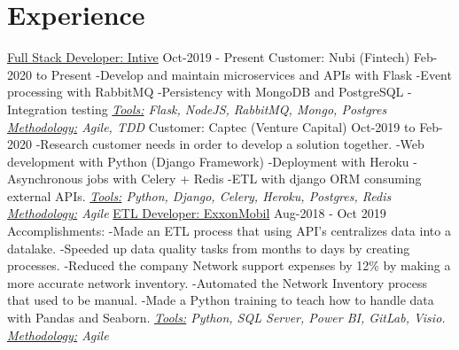 \documentclass[letterpaper]{twentysecondcv} %
\begin{document}
\section{Experience}
\newline\newline 
{\large\underline{Full Stack Developer: Intive}}  \hspace*{115pt}  Oct-2019 - Present
\newline\newline
Customer: Nubi (Fintech) \hspace*{155pt} Feb-2020 to Present
    \newline-Develop and maintain microservices and APIs with Flask
    \newline-Event processing with RabbitMQ
    \newline-Persistency with MongoDB and PostgreSQL
    \newline-Integration testing
    \newline\textit{\underline{Tools:} Flask, NodeJS, RabbitMQ, Mongo, Postgres \underline{Methodology:} Agile, TDD}
    \newline\newline
Customer: Captec (Venture Capital) \hspace*{90pt} Oct-2019 to Feb-2020
    \newline-Research customer needs in order to develop a solution together.
    \newline-Web development with Python (Django Framework)
    \newline-Deployment with Heroku
    \newline-Asynchronous jobs with Celery + Redis
    \newline-ETL with django ORM consuming external APIs.
    \newline\textit{\underline{Tools:} Python, Django, Celery, Heroku, Postgres, Redis \underline{Methodology:} Agile}
    \newline\newline
{\large\underline{ETL Developer: ExxonMobil}}  \hspace*{115pt}  Aug-2018 - Oct 2019
\newline\newline
Accomplishments:
    \newline-Made an ETL process that using API's centralizes data into a datalake.
    \newline-Speeded up data quality tasks from months to days by creating processes.
    \newline-Reduced the company Network support expenses by 12\% by making a more accurate network inventory.
    \newline-Automated the Network Inventory process that used to be manual.
    \newline-Made a Python training to teach how to handle data with Pandas and Seaborn.
    \newline\newline\textit{\underline{Tools:} Python, SQL Server, Power BI, GitLab, Visio. \underline{Methodology:} Agile}
    \newline
    
\end{document}
